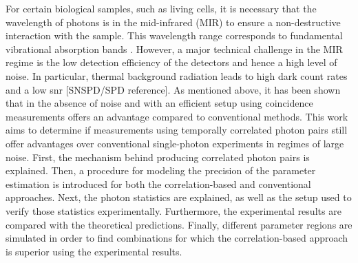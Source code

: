 For certain biological samples, such as living cells, it is necessary that the wavelength of photons is in the mid-infrared (MIR) to ensure a non-destructive interaction with the sample. This wavelength range corresponds to fundamental vibrational absorption bands \cite{katoLabelfreeVisualizationPhotosynthetic2023,ishiganeLabelfreeMidinfraredPhotothermal2023}. However, a major technical challenge in the MIR regime is the low detection efficiency of the detectors and hence a high level of noise. In particular, thermal background radiation leads to high dark count rates and a low \acrfull{snr} [SNSPD/SPD reference]. \newline
As mentioned above, it has been shown that in the absence of noise and with an efficient setup using coincidence measurements offers an advantage compared to conventional methods. This work aims to determine if measurements using temporally correlated photon pairs still offer advantages over conventional single-photon experiments in regimes of large noise. \newline
First, the mechanism behind producing correlated photon pairs is explained. Then, a procedure for modeling the precision of the parameter estimation is introduced for both the correlation-based and conventional approaches. Next, the photon statistics are explained, as well as the setup used to verify those statistics experimentally. Furthermore, the experimental results are compared with the theoretical predictions. Finally, different parameter regions are simulated in order to find combinations for which the correlation-based approach is superior using the experimental results.








